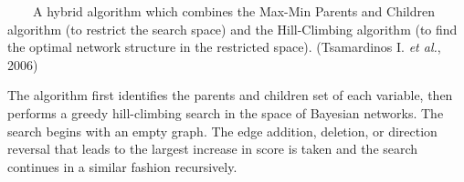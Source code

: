 ~~~~A hybrid algorithm which combines the Max-Min Parents and Children algorithm (to restrict the search space) and the Hill-Climbing algorithm (to find the optimal network structure in the restricted space). (Tsamardinos I. \emph{et al.}, 2006)

The algorithm first identifies the parents and children set of each variable, then performs a greedy hill-climbing search in the space of Bayesian networks. The search begins with an empty graph. The edge addition, deletion, or direction reversal that leads to the largest increase in score is taken and the search continues in a similar fashion recursively.